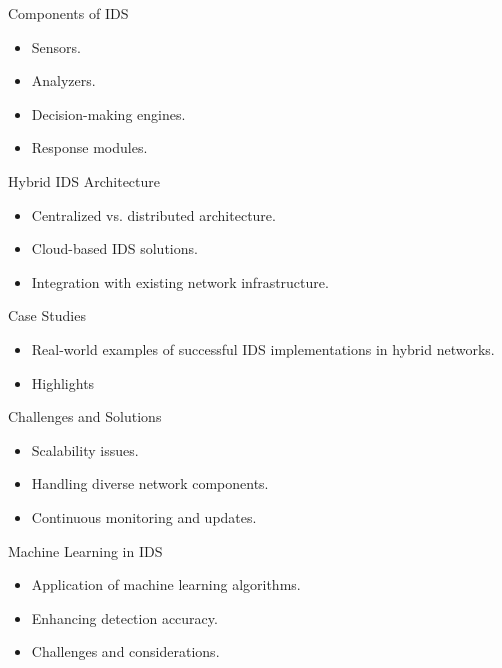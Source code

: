 \documentclass{beamer}
\begin{document}
\begin{frame}{Components of IDS}
    \begin{itemize}
        \item Sensors.
        \item Analyzers.
        \item Decision-making engines.
        \item Response modules.
    \end{itemize}
\end{frame}





\begin{frame}{Hybrid IDS Architecture}
    \begin{itemize}
        \item Centralized vs. distributed architecture.
        \item Cloud-based IDS solutions.
        \item Integration with existing network infrastructure.
    \end{itemize}
\end{frame}


\begin{frame}{Case Studies}
    \begin{itemize}
        \item Real-world examples of successful IDS implementations in hybrid networks.
        \item Highlights
    \end{itemize}
\end{frame}


\begin{frame}{Challenges and Solutions}
    \begin{itemize}
        \item Scalability issues.
        \item Handling diverse network components.
        \item Continuous monitoring and updates.
    \end{itemize}
\end{frame}


\begin{frame}{Machine Learning in IDS}
    \begin{itemize}
        \item Application of machine learning algorithms.
        \item Enhancing detection accuracy.
        \item Challenges and considerations.
    \end{itemize}
\end{frame}
\end{document}
